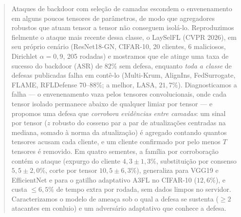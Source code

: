 \begin{abstract}
Ataques de backdoor com seleção de camadas escondem o envenenamento em alguns poucos
tensores de parâmetros, de modo que agregadores robustos que atuam tensor a tensor não
conseguem isolá-lo. Reproduzimos fielmente o ataque mais recente dessa classe,
o LaySelFL (CVPR 2026), em seu próprio cenário (ResNet18-GN, CIFAR-10, 20 clientes, 6
maliciosos, Dirichlet $\alpha{=}0{,}9$, 205 rodadas) e mostramos que ele atinge uma taxa de
sucesso do backdoor (ASR) de $82\%$ sem defesa, enquanto \emph{toda a classe} de defesas
publicadas falha em contê-lo (Multi-Krum, AlignIns, FedSurrogate, FLAME, RFLDefense $70$--$88\%$;
a melhor, LASA, $21{,}7\%$). Diagnosticamos a falha --- o envenenamento vaza pelos tensores
convolucionais, onde cada tensor isolado permanece abaixo de qualquer limiar por tensor --- e
propomos uma defesa que \emph{corrobora evidências entre camadas}: um sinal por tensor ($z$
robusto do cosseno par a par de atualizações centradas na mediana, somado à norma da atualização)
é agregado contando quantos tensores acusam cada cliente, e um cliente confirmado por pelo menos
$T$ tensores é removido. Em quatro sementes, a família por corroboração contém o ataque (expurgo
do cliente $4{,}3\pm1{,}3\%$, substituição por consenso $5{,}5\pm2{,}0\%$, corte por tensor
$10{,}5\pm6{,}3\%$), generaliza para VGG19 e EfficientNet e para o gatilho adaptativo A3FL no
CIFAR-10 ($12{,}6\%$), e custa $\leq 6{,}5\%$ de tempo extra por rodada, sem dados limpos no
servidor. Caracterizamos o modelo de ameaça sob o qual a defesa se sustenta ($\geq 2$ atacantes
em conluio) e um adversário adaptativo que conhece a defesa.
\end{abstract}
